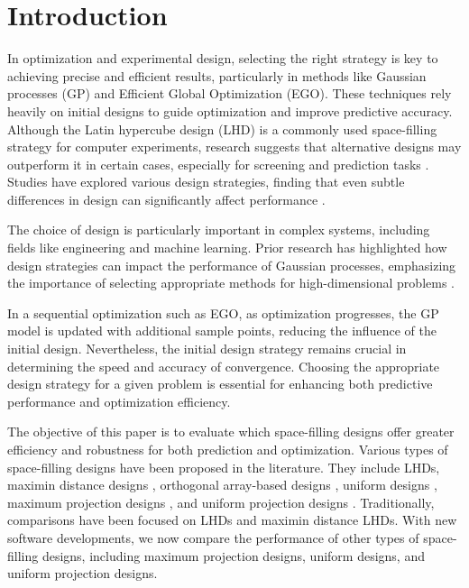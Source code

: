 \documentclass [PhD] {package/uclathes}
\begin{document}
\section{Introduction}



In optimization and experimental design, selecting the right strategy is key to achieving precise and efficient results, particularly in methods like Gaussian processes (GP) and Efficient Global Optimization (EGO). These techniques rely heavily on initial designs to guide optimization and improve predictive accuracy. Although the Latin hypercube design (LHD) \parencite{mckay1979comparison} is a commonly used space-filling strategy for computer experiments, research suggests that alternative designs may outperform it in certain cases, especially for screening and prediction tasks \parencite{welch1992screening}. Studies have explored various design strategies, finding that even subtle differences in design can significantly affect performance \parencite{chen2016analysis}.

The choice of design is particularly important in complex systems, including fields like engineering and machine learning. Prior research has highlighted how design strategies can impact the performance of Gaussian processes, emphasizing the importance of selecting appropriate methods for high-dimensional problems \parencite{harari2014optimal}.

In a sequential optimization such as EGO, as optimization progresses, the GP model is updated with additional sample points, reducing the influence of the initial design. Nevertheless, the initial design strategy remains crucial in determining the speed and accuracy of convergence. Choosing the appropriate design strategy for a given problem is essential for enhancing both predictive performance and optimization efficiency.

The objective of this paper is to evaluate which space-filling designs offer greater efficiency and robustness for both prediction and optimization.
Various types of space-filling designs have been proposed in the literature. They include LHDs, maximin distance designs \parencite{johnson1990minimax, morris1995exploratory}, orthogonal array-based designs \parencite{tang1993orthogonal, xiao2018construction}, uniform designs \parencite{fang2000uniform}, maximum projection designs \parencite{joseph2015maximum},  and uniform projection designs \parencite{sun2019uniform}.
Traditionally, comparisons have been focused on LHDs and maximin distance LHDs. With new software developments, we now compare the performance of other types of space-filling designs, including maximum projection designs, uniform designs, and uniform projection designs.
\end{document}
